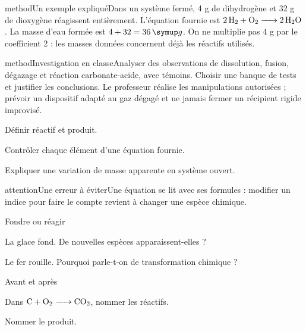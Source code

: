 \begin{pcEncadre}{method}{Un exemple expliqué}Dans un système fermé, 4 g de dihydrogène et 32 g de dioxygène réagissent entièrement. L’équation fournie est $\ce{2 H2 + O2 -> 2 H2O}$. La masse d’eau formée est $4+32=36\unite g$. On ne multiplie pas 4 g par le coefficient 2 : les masses données concernent déjà les réactifs utilisés.\end{pcEncadre}
\label{activite-3}
\begin{pcEncadre}{method}{Investigation en classe}Analyser des observations de dissolution, fusion, dégazage et réaction carbonate-acide, avec témoins. Choisir une banque de tests et justifier les conclusions. Le professeur réalise les manipulations autorisées ; prévoir un dispositif adapté au gaz dégagé et ne jamais fermer un récipient rigide improvisé.\end{pcEncadre}
\begin{questions}
\item Définir réactif et produit.
\item Contrôler chaque élément d’une équation fournie.
\item Expliquer une variation de masse apparente en système ouvert.
\end{questions}
\begin{pcEncadre}{attention}{Une erreur à éviter}Une équation se lit avec ses formules : modifier un indice pour faire le compte revient à changer une espèce chimique.\end{pcEncadre}
\pcGrille
\clearpage{}
\par\noindent\begin{minipage}{\linewidth}
\begin{exercice}[1]{Fondre ou réagir}
\begin{questions}
\item La glace fond. De nouvelles espèces apparaissent-elles ?
\item Le fer rouille. Pourquoi parle-t-on de transformation chimique ?
\end{questions}
\end{exercice}
\end{minipage}
\par\noindent\begin{minipage}{\linewidth}
\begin{exercice}[1]{Avant et après}
\begin{questions}
\item Dans $\ce{C + O2 -> CO2}$, nommer les réactifs.
\item Nommer le produit.
\end{questions}
\end{exercice}
\end{minipage}
